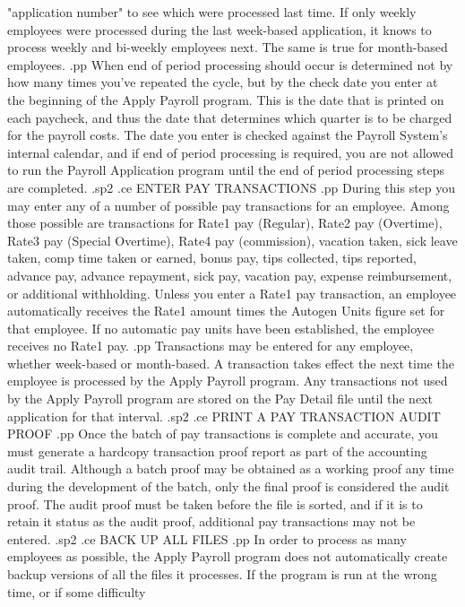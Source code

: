 "application number"
to see which were processed last time.	If only
weekly employees were processed during the last week-based application,
it knows to process weekly and bi-weekly employees next.  The same is true
for month-based employees.
.pp
When end of period processing should occur is determined not by how many
times you've repeated the cycle, but by the check date you enter at the
beginning of the Apply Payroll program.  This is the date that is
printed on each paycheck, and thus the date that determines which
quarter is to be charged for the payroll costs.  The date you enter is
checked against the Payroll System's internal calendar, and if end of
period processing is required, you are not allowed to run the
Payroll Application program until the end of period processing steps
are completed.
.sp2
.ce
ENTER PAY TRANSACTIONS
.pp
During this step you may enter any of a number of possible pay transactions for
an employee.  Among those possible are transactions for
Rate1 pay (Regular), Rate2 pay (Overtime), Rate3 pay
(Special Overtime), Rate4 pay (commission), vacation taken,
sick leave taken,
comp time taken or earned, bonus pay, tips collected, tips reported,
advance pay, advance repayment,
sick pay, vacation pay, expense reimbursement, or additional withholding.
Unless you enter a Rate1 pay transaction, an employee automatically
receives the Rate1 amount times the Autogen Units figure set for that employee.
If no automatic pay units have been established, the employee receives no
Rate1 pay.
.pp
Transactions may be entered for any employee, whether week-based or
month-based.  A transaction takes effect the next time the employee
is processed by the Apply Payroll program.  Any transactions not
used by the Apply Payroll program are stored on the Pay Detail file
until the next application for that interval.
.sp2
.ce
PRINT A PAY TRANSACTION AUDIT PROOF
.pp
Once the batch of pay transactions is complete and accurate, you must
generate a hardcopy transaction proof report as part of the
accounting audit trail.  Although a batch proof may be obtained as a working
proof
any time during the development of the batch, only the final proof is
considered the audit proof.
The audit proof must be taken before the file is sorted, and if
it is to retain it status as the audit proof, additional pay transactions
may not be entered.
.sp2
.ce
BACK UP ALL FILES
.pp
In order to process as many employees as possible,
the Apply Payroll program does not automatically create backup versions
of all the files it processes.
If the program is run at the wrong time, or if some difficulty
